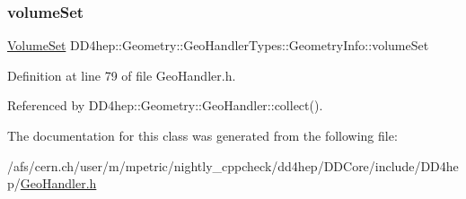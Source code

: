 \subsubsection{\texorpdfstring{volume\+Set}{volumeSet}}
{\footnotesize\ttfamily \hyperlink{class_d_d4hep_1_1_geometry_1_1_geo_handler_types_a87ea3b22bdfe08f1a4afca3d58fd8ca0}{Volume\+Set} D\+D4hep\+::\+Geometry\+::\+Geo\+Handler\+Types\+::\+Geometry\+Info\+::volume\+Set}



Definition at line 79 of file Geo\+Handler.\+h.



Referenced by D\+D4hep\+::\+Geometry\+::\+Geo\+Handler\+::collect().



The documentation for this class was generated from the following file\+:\begin{DoxyCompactItemize}
\item 
/afs/cern.\+ch/user/m/mpetric/nightly\+\_\+cppcheck/dd4hep/\+D\+D\+Core/include/\+D\+D4hep/\hyperlink{_geo_handler_8h}{Geo\+Handler.\+h}\end{DoxyCompactItemize}

